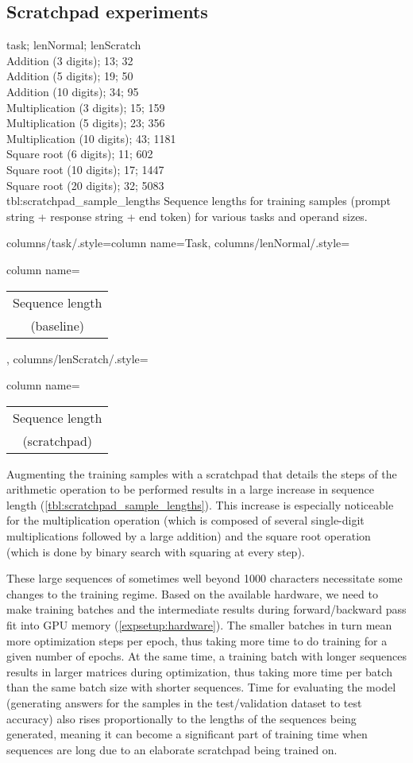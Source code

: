 \subsection{Scratchpad experiments}
\label{setup:scratchpad}


\label{scratchpad_changes}

{
	task; lenNormal; lenScratch\\
	Addition (3 digits); 13; 32 \\
	Addition (5 digits); 19; 50 \\
	Addition (10 digits); 34; 95 \\
	Multiplication (3 digits); 15; 159 \\
	Multiplication (5 digits); 23; 356 \\
	Multiplication (10 digits); 43; 1181 \\
	Square root (6 digits); 11; 602 \\
	Square root (10 digits); 17; 1447 \\
	Square root (20 digits); 32; 5083 \\
}
{tbl:scratchpad_sample_lengths}
{
	Sequence lengths for training samples (prompt string + response string + end token) for various tasks and operand sizes.
}
{%
	columns/task/.style={column name={Task}},
	columns/lenNormal/.style={column name={\begin{tabular}{c} Sequence length \\ (baseline) \\ \end{tabular}}},
	columns/lenScratch/.style={column name={\begin{tabular}{c} Sequence length \\ (scratchpad) \\ \end{tabular}}}
}

Augmenting the training samples with a scratchpad that details the steps of the arithmetic operation to be performed results in a large increase in sequence length (\cref{tbl:scratchpad_sample_lengths}). This increase is especially noticeable for the multiplication operation (which is composed of several single-digit multiplications followed by a large addition) and the square root operation (which is done by binary search with squaring at every step).

These large sequences of sometimes well beyond 1000 characters necessitate some changes to the training regime. Based on the available hardware, we need to make training batches and the intermediate results during forward/backward pass fit into GPU memory (\cref{expsetup:hardware}). The smaller batches in turn mean more optimization steps per epoch, thus taking more time to do training for a given number of epochs. At the same time, a training batch with longer sequences results in larger matrices during optimization, thus taking more time per batch than the same batch size with shorter sequences.
Time for evaluating the model (generating answers for the samples in the test/validation dataset to test accuracy) also rises proportionally to the lengths of the sequences being generated, meaning it can become a significant part of training time when sequences are long due to an elaborate scratchpad being trained on.

